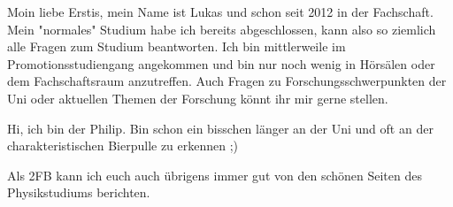 \begin{multicols*}{2}
{Moin liebe Erstis,
	mein Name ist Lukas und schon seit 2012 in der Fachschaft. Mein "normales" Studium habe ich bereits abgeschlossen, kann also so ziemlich alle Fragen zum Studium beantworten.
	Ich bin mittlerweile im Promotionsstudiengang angekommen und bin nur noch wenig in Hörsälen oder dem Fachschaftsraum anzutreffen.
	Auch Fragen zu Forschungsschwerpunkten der Uni oder aktuellen Themen der Forschung könnt ihr mir gerne stellen.}



{Hi, ich bin der Philip. Bin schon ein bisschen länger an der Uni und oft an der charakteristischen Bierpulle zu erkennen ;)
	
	Als 2FB kann ich euch auch übrigens immer gut von den schönen Seiten des Physikstudiums berichten.
	\vspace{\baselineskip}}




\end{multicols*}
